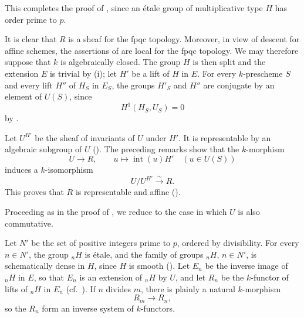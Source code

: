 This completes the proof of , since an étale group of
multiplicative type \(H\) has order prime to \(p\).

It is clear that \(R\) is a sheaf for the fpqc topology.
Moreover, in view of descent for affine schemes, the assertions
of  are local for the fpqc topology.  We may therefore
suppose that \(k\) is algebraically closed.  The group \(H\) is
then split and the extension \(E\) is trivial by (i); let
\(H'\) be a lift of \(H\) in \(E\).  For every \(k\)-prescheme
\(S\) and every lift \(H''\) of \(H_S\) in \(E_S\), the groups
\(H'_S\) and \(H''\) are conjugate by an element of \(U(S)\),
since
\[
  H^1(H_S,U_S)=0
\]
by .

Let \(U^{H'}\) be the sheaf of invariants of \(U\) under \(H'\).
It is representable by an algebraic subgroup of \(U\)
().  The preceding remarks show that the
\(k\)-morphism
\[
  U\longrightarrow R,
  \qquad
  u\longmapsto \operatorname{int}(u)H'
  \quad (u\in U(S))
\]
induces a \(k\)-isomorphism
\[
  U/U^{H'}\xrightarrow{\ \sim\ }R.
\]
This proves that \(R\) is representable and affine ().




Proceeding as in the proof of , we reduce to the case in
which \(U\) is also commutative.

Let \(N'\) be the set of positive integers prime to \(p\), ordered
by divisibility.  For every \(n\in N'\), the group \({}_nH\) is
étale, and the family of groups \({}_nH\), \(n\in N'\), is
schematically dense in \(H\), since \(H\) is smooth
().  Let \(E_n\) be the inverse image of
\({}_nH\) in \(E\), so that \(E_n\) is an extension of
\({}_nH\) by \(U\), and let \(R_n\) be the \(k\)-functor of
lifts of \({}_nH\) in \(E_n\) (cf.\ ).  If \(n\)
divides \(m\), there is plainly a natural \(k\)-morphism
\[
  R_m\longrightarrow R_n,
\]
so the \(R_n\) form an inverse system of \(k\)-functors.

